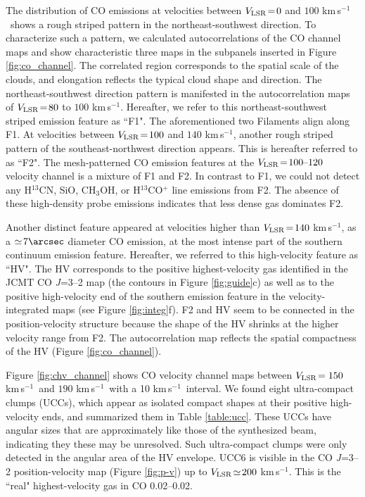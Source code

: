 \documentclass[twocolumn]{aastex631}
\newcommand\kms{\hbox{km$\,$s$^{-1}$}}
\newcommand\VLSR{\hbox{$V_{\rm LSR}$}}
\begin{document}
The distribution of CO emissions at velocities between $\VLSR\! =\! 0$ and $100$ \kms\ shows a rough striped pattern in the northeast-southwest direction. To characterize such a pattern, we calculated autocorrelations of the CO channel maps and show characteristic three maps in the subpanels inserted in Figure \ref{fig:co_channel}. The correlated region corresponds to the spatial scale of the clouds, and elongation reflects the typical cloud shape and direction. The northeast-southwest direction pattern is manifested in the autocorrelation maps of $\VLSR\! =\! 80$ to $100$ \kms . Hereafter, we refer to this northeast-southwest striped emission feature as ``F1".  The aforementioned two Filaments align along F1. At velocities between $\VLSR\! =\! 100$ and $140$ \kms , another rough striped pattern of the southeast-northwest direction appears. This is hereafter referred to as ``F2".  The mesh-patterned CO emission features at the $\VLSR\! =\! 100\mbox{--}120$ velocity channel is a mixture of F1 and F2. In contrast to F1, we could not detect any H$^{13}$CN, SiO, CH$_3$OH, or H$^{13}$CO$^{+}$ line emissions from F2. The absence of these high-density probe emissions indicates that less dense gas dominates F2.

Another distinct feature appeared at velocities higher than $\VLSR\! =\! 140$ \kms , as a $\simeq\! 7\arcsec$ diameter CO emission, at the most intense part of the southern continuum emission feature. Hereafter, we referred to this high-velocity feature as ``HV". The HV corresponds to the positive highest-velocity gas identified in the JCMT CO {\it J}=3--2 map (the contours in Figure \ref{fig:guide}c) as well as to the positive high-velocity end of the southern emission feature in the velocity-integrated maps (see Figure \ref{fig:integ}f). F2 and HV seem to be connected in the position-velocity structure because the shape of the HV shrinks at the higher velocity range from F2. The autocorrelation map reflects the spatial compactness of the HV (Figure \ref{fig:co_channel}).  

Figure \ref{fig:chv_channel} shows CO velocity channel maps between $\VLSR\!=150$ \kms\ and $190$ \kms\ with a 10 \kms\ interval. We found eight ultra-compact clumps (UCCs), which appear as isolated compact shapes at their positive high-velocity ends, and summarized them in Table \ref{table:ucc}. These UCCs have angular sizes that are approximately like those of the synthesized beam, indicating they these may be unresolved. Such ultra-compact clumps were only detected in the angular area of the HV envelope. UCC6 is visible in the CO {\it J}=3--2 position-velocity map (Figure \ref{fig:p-v}) up to $V_{\rm LSR}\!\simeq\! 200$ \kms. This is the ``real" highest-velocity gas in CO 0.02--0.02.
\end{document}
